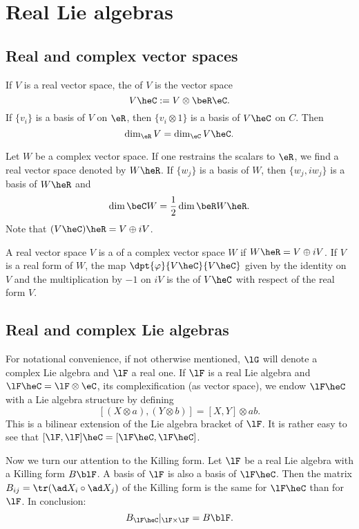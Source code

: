 \section{Real Lie algebras}

\subsection{Real and complex vector spaces}

If $V$ is a real vector space, the  of $V$ is the vector space
\[
  V\heC:=V\otimes\beR\eC.
\]
If $\{v_i\}$ is a basis of $V$ on $\eR$, then $\{v_i\otimes 1\}$ is a basis of $V\heC$ on $C$. Then
\[
   \dim_{\eR}V=\dim_{\eC}V\heC.
\]

Let $W$ be a complex vector space. If one restrains the scalars to $\eR$, we find a real vector space denoted by $W\heR$. If $\{w_j\}$ is a basis of $W$, then $\{w_j,iw_j\}$ is a basis of $W\heR$ and
\[
  \dim\beC W=\frac{1}{2}\dim\beR W\heR.
\]
Note that $(V\heC)\heR=V\oplus iV$.

A real vector space $V$ is a  of a complex vector space $W$ if $W\heR=V\oplus iV$. If $V$ is a real form of $W$, the map $\dpt{\varphi}{V\heC}{V\heC}$ given by the identity on $V$ and the multiplication by $-1$ on $iV$ is the  of $V\heC$ with respect of the real form $V$.

\subsection{Real and complex Lie algebras}

For notational convenience, if not otherwise mentioned, $\lG$ will denote a complex Lie algebra and $\lF$ a real one. If $\lF$ is a real Lie algebra and $\lF\heC=\lF\otimes\eC$, its complexification (as vector space), we endow $\lF\heC$ with a Lie algebra structure by defining
\[
  [ (X\otimes a),(Y\otimes b)  ]=[X,Y]\otimes ab.
\]
This is a bilinear extension of the Lie algebra bracket of $\lF$. It is rather easy to see that $[\lF,\lF]\heC=[\lF\heC,\lF\heC]$.

Now we turn our attention to the Killing form. Let $\lF$ be a real Lie algebra with a Killing form $B\blF$. A basis of $\lF$ is also a basis of $\lF\heC$. Then the matrix $B_{ij}=\tr( \ad X_i\circ\ad X_j )$ of the Killing form is the same for $\lF\heC$ than for $\lF$. In conclusion:
\[
   B_{\lF\heC}|_{\lF\times\lF}=B\blF.
\]

